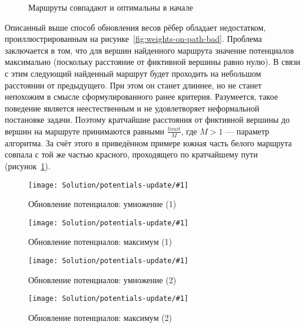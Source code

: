 \begin{figure}
    \caption{Маршруты совпадают и оптимальны в начале}
    \label{fig:weights-on-path-good}
\end{figure}

Описанный выше способ обновления весов рёбер обладает недостатком,
проиллюстрированным на рисунке~\ref{fig:weights-on-path-bad}. Проблема
заключается в том, что для вершин найденного маршрута значение
потенциалов максимально (поскольку расстояние от фиктивной вершины
равно нулю). В связи с этим следующий найденный маршрут будет
проходить на небольшом расстоянии от предыдущего. При этом он станет
длиннее, но не станет непохожим в смысле сформулированного ранее
критерия. Разумеется, такое поведение является неестественным и не
удовлетворяет неформальной постановке задачи. Поэтому кратчайшие
расстояния от фиктивной вершины до вершин на маршруте принимаются
равными $\frac{limit}{M}$, где $M > 1$ --- параметр алгоритма. За счёт
этого в приведённом примере южная часть белого маршрута совпала с той
же частью красного, проходящего по кратчайшему пути
(рисунок~\ref{fig:weights-on-path-good}).

\FloatBarrier

\newcommand{\potentialsupdatepicture}[1]{
    \begin{center}
    \texttt{[image: Solution/potentials-update/\#1]}
    \end{center}
}

\begin{figure}
    \potentialsupdatepicture{accum1}
    \caption{Обновление потенциалов: умножение (1)}
    \label{fig:update-accum1}
\end{figure}

\begin{figure}
    \potentialsupdatepicture{max1}
    \caption{Обновление потенциалов: максимум (1)}
    \label{fig:update-max1}
\end{figure}

\begin{figure}
    \potentialsupdatepicture{accum2}
    \caption{Обновление потенциалов: умножение (2)}
    \label{fig:update-accum2}
\end{figure}

\begin{figure}
    \potentialsupdatepicture{max2}
    \caption{Обновление потенциалов: максимум (2)}
    \label{fig:update-max2}
\end{figure}

